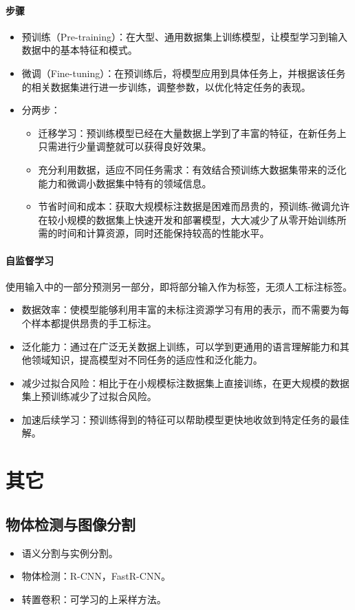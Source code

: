 \documentclass[
12pt, %
a4paper, 
oneside, %
headinclude,footinclude, %
]{scrartcl}
\begin{document}
\paragraph{步骤}
\begin{itemize}
\item 预训练（Pre-training）：在大型、通用数据集上训练模型，让模型学习到输入数据中的基本特征和模式。
\item 微调（Fine-tuning）：在预训练后，将模型应用到具体任务上，并根据该任务的相关数据集进行进一步训练，调整参数，以优化特定任务的表现。
\item 分两步：
\begin{itemize}
\item 迁移学习：预训练模型已经在大量数据上学到了丰富的特征，在新任务上只需进行少量调整就可以获得良好效果。
\item 充分利用数据，适应不同任务需求：有效结合预训练大数据集带来的泛化能力和微调小数据集中特有的领域信息。
\item 节省时间和成本：获取大规模标注数据是困难而昂贵的，预训练-微调允许在较小规模的数据集上快速开发和部署模型，大大减少了从零开始训练所需的时间和计算资源，同时还能保持较高的性能水平。
\end{itemize}
\end{itemize}
\paragraph{自监督学习}
使用输入中的一部分预测另一部分，即将部分输入作为标签，无须人工标注标签。
\begin{itemize}
\item 数据效率：使模型能够利用丰富的未标注资源学习有用的表示，而不需要为每个样本都提供昂贵的手工标注。
\item 泛化能力：通过在广泛无关数据上训练，可以学到更通用的语言理解能力和其他领域知识，提高模型对不同任务的适应性和泛化能力。
\item 减少过拟合风险：相比于在小规模标注数据集上直接训练，在更大规模的数据集上预训练减少了过拟合风险。
\item 加速后续学习：预训练得到的特征可以帮助模型更快地收敛到特定任务的最佳解。
\end{itemize}
\section{其它}
\subsection[物体检测与图像分割]{物体检测与图像分割}
\begin{itemize}
\item 语义分割与实例分割。
\item 物体检测：R-CNN，FastR-CNN。
\item 转置卷积：可学习的上采样方法。
\end{itemize}
\end{document}
